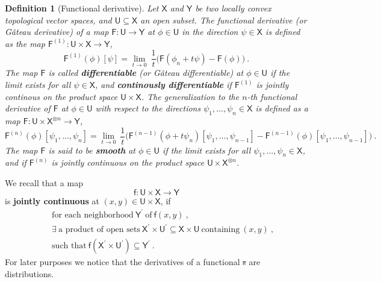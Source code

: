 \documentclass[11pt]{book}
\newcommand{\sbar}[1]{\sout{\color{red} #1}}
\newcommand{\Fsf}{\mathsf{F}}
\newcommand{\Usf}{\mathsf{U}}
\newcommand{\Xsf}{\mathsf{X}}
\newcommand{\Ysf}{\mathsf{Y}}
\newcommand{\fsf}{\mathsf{f}}
\theoremstyle{break}
\newtheorem{definition}{Definition}[chapter]
\begin{document}
\begin{definition}[Functional derivative]\label{def:functional_derivative}
Let $\Xsf$ and $\Ysf$ be two locally convex topological vector spaces, and $\Usf \subseteq \Xsf$ an open subset. The functional derivative (or Gâteau derivative) of a map $\Fsf:  \Usf \to \Ysf$ at $\phi \in \Usf$ in the direction $\psi \in \Xsf$ is defined as the map $\Fsf^{(1)} : \Usf \times \Xsf \to \Ysf$,
%
\begin{equation*}
\Fsf^{(1)}(\phi)[\psi] = \lim_{t \to 0} \ \frac{1}{t} \bigg( \Fsf(\phi_n + t \psi) - \Fsf(\phi) \bigg) \ .
\end{equation*}
% 
The map $\Fsf$ is called \textbf{differentiable} (or Gâteau differentiable) at $\phi \in \Usf$ if the limit exists for all $\psi \in \Xsf$, and \textbf{continously differentiable} if $\Fsf^{(1)}$ is jointly continous on the product space $\Usf \times \Xsf$.
%
%
The generalization to the $n$-th functional derivative of $\Fsf$ at $\phi \in \Usf$ with respect to the directions $\psi_1, \dots, \psi_n \in \Xsf$ is defined as a map $\Fsf : \Usf \times \Xsf^{\otimes n} \to \Ysf$,
%
\begin{equation*}
\Fsf^{(n)}(\phi)[\psi_1,\dots ,\psi_n] = \lim_{t \to 0} \ \frac{1}{t} \bigg( \Fsf^{(n-1)}(\phi + t \psi_n)[\psi_1,\dots ,\psi_{n-1}] - \Fsf^{(n-1)}(\phi)[\psi_1,\dots ,\psi_{n-1}] \bigg) \ .
\end{equation*}
%
The map $\Fsf$ is said to be \textbf{smooth} at $\phi \in \Usf$ if the limit exists for all $\psi_1, \dots, \psi_n \in \Xsf$, and if $\Fsf^{(n)}$ is jointly continuous on the product space $\Usf \times \Xsf^{\otimes n}$.
\end{definition}


We recall that a map 
%
\begin{equation*}
\fsf : \Usf \times \Xsf \to \Ysf
\end{equation*}
%
is \textbf{jointly continuous} at $(x,y) \in \Usf \times \Xsf$, if 
%
\begin{eqnarray*}
&& \mbox{for each neighborhood} \ \Ysf^\prime \ \mbox{of} \ \fsf(x,y) \ , \\
&& \exists \ \mbox{a product of open sets} \ \Xsf^\prime \times \Usf^\prime \subseteq \Xsf \times \Usf \ \mbox{containing} \ (x,y) \ , \\
&& \mbox{such that} \ \fsf(\Xsf^\prime \times \Usf^\prime) \subseteq \Ysf^\prime \ .
\end{eqnarray*}
%
For later purposes we notice that the derivatives of a functional\sbar{s} are distributions.
\end{document}
